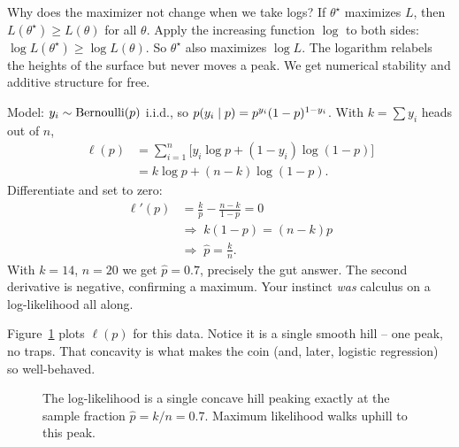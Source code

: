 \begin{whybox}
Why does the maximizer not change when we take logs? If $\theta^\star$ maximizes
$L$, then $L(\theta^\star) \ge L(\theta)$ for all $\theta$. Apply the increasing
function $\log$ to both sides: $\log L(\theta^\star) \ge \log L(\theta)$. So
$\theta^\star$ also maximizes $\log L$. The logarithm relabels the heights of the
surface but never moves a peak. We get numerical stability and additive
structure for free.
\end{whybox}

\begin{example}
\label{ch34:coin-mle}
Model: $y_i \sim \operatorname{Bernoulli}(p)$ i.i.d., so $p(y_i\mid p) = p^{y_i}(1-p)^{1-y_i}$. With
$k = \sum y_i$ heads out of $n$,
\begin{align*}
  \ell(p) &= \sum_{i=1}^n \big[y_i\log p + (1-y_i)\log(1-p)\big] \\
          &= k\log p + (n-k)\log(1-p).
\end{align*}
Differentiate and set to zero:
\begin{align*}
  \ell'(p) &= \frac{k}{p} - \frac{n-k}{1-p} = 0 \\
  &\Longrightarrow\; k(1-p) = (n-k)p \\
  &\Longrightarrow\; \hat p = \frac{k}{n}.
\end{align*}
With $k=14$, $n=20$ we get $\hat p = 0.7$, precisely the gut answer. The second
derivative is negative, confirming a maximum. Your instinct \emph{was} calculus
on a log-likelihood all along.
\end{example}

Figure~\ref{ch34:fig-loglik} plots $\ell(p)$ for this data. Notice it is a single
smooth hill -- one peak, no traps. That concavity is what makes the coin (and,
later, logistic regression) so well-behaved.

\begin{figure}[H]
\centering
{}
\caption{The log-likelihood is a single concave hill peaking exactly at the
sample fraction $\hat p = k/n = 0.7$. Maximum likelihood walks uphill to this
peak.}
\label{ch34:fig-loglik}
\end{figure}

